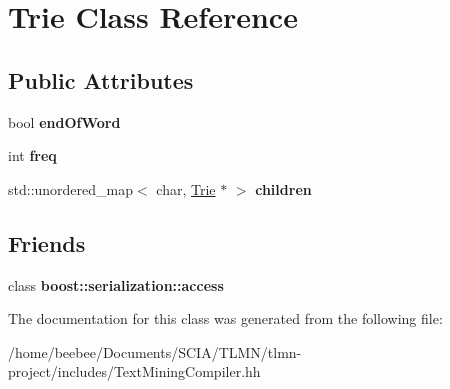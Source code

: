 \hypertarget{classTrie}{}\section{Trie Class Reference}
\label{classTrie}
\subsection*{Public Attributes}
\begin{DoxyCompactItemize}
\item 
\mbox{\label{classTrie_a97b59f231dfea3c83dc7371ad4c87299}} 
bool {\bfseries end\+Of\+Word}
\item 
\mbox{\label{classTrie_a5f02fe3070d58c4a6731bccf9be36cd9}} 
int {\bfseries freq}
\item 
\mbox{\label{classTrie_a56ee68454a585a7fbdcf52abb35fc85e}} 
std\+::unordered\+\_\+map$<$ char, \hyperlink{classTrie}{Trie} $\ast$ $>$ {\bfseries children}
\end{DoxyCompactItemize}
\subsection*{Friends}
\begin{DoxyCompactItemize}
\item 
\mbox{\label{classTrie_ac98d07dd8f7b70e16ccb9a01abf56b9c}} 
class {\bfseries boost\+::serialization\+::access}
\end{DoxyCompactItemize}


The documentation for this class was generated from the following file\+:\begin{DoxyCompactItemize}
\item 
/home/beebee/\+Documents/\+S\+C\+I\+A/\+T\+L\+M\+N/tlmn-\/project/includes/Text\+Mining\+Compiler.\+hh\end{DoxyCompactItemize}
